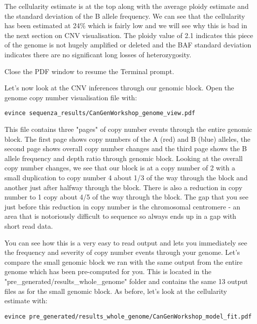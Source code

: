 The cellularity estimate is at the top along with the average ploidy estimate and the standard deviation of the B allele frequency. We can see that the cellularity has been estimated at 24\% which is fairly low and we will see why this is bad in the next section on CNV visualisation. The ploidy value of 2.1 indicates this piece of the genome is not hugely amplified or deleted and the BAF standard deviation indicates there are no significant long losses of heterozygosity.

Close the PDF window to resume the Terminal prompt.

Let's now look at the CNV inferences through our genomic block. Open the genome copy number visualisation file with:

\begin{steps}
\begin{lstlisting}
evince sequenza_results/CanGenWorkshop_genome_view.pdf
\end{lstlisting}
\end{steps}

This file contains three "pages" of copy number events through the entire genomic block. The first page shows copy numbers of the A (red) and B (blue) alleles, the second page shows overall copy number changes and the third page shows the B allele frequency and depth ratio through genomic block. Looking at the overall copy number changes, we see that our block is at a copy number of 2 with a small duplication to copy number 4 about 1/3 of the way through the block and another just after halfway through the block. There is also a reduction in copy number to 1 copy about 4/5 of the way through the block. The gap that you see just before this reduction in copy number is the chromosomal centromere - an area that is notoriously difficult to sequence so always ends up in a gap with short read data.

You can see how this is a very easy to read output and lets you immediately see the frequency and severity of copy number events through your genome. Let's compare the small genomic block we ran with the same output from the entire genome which has been pre-computed for you. This is located in the "pre_generated/results_whole_genome" folder and contains the same 13 output files as for the small genomic block. As before, let's look at the cellularity estimate with:

\begin{steps}
\begin{lstlisting}
evince pre_generated/results_whole_genome/CanGenWorkshop_model_fit.pdf
\end{lstlisting}
\end{steps}

